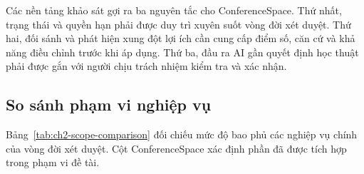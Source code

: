Các nền tảng khảo sát gợi ra ba nguyên tắc cho ConferenceSpace. Thứ nhất, trạng thái và quyền hạn phải được duy trì xuyên suốt vòng đời xét duyệt. Thứ hai, đối sánh và phát hiện xung đột lợi ích cần cung cấp điểm số, căn cứ và khả năng điều chỉnh trước khi áp dụng. Thứ ba, đầu ra AI gần quyết định học thuật phải được gắn với người chịu trách nhiệm kiểm tra và xác nhận.

\subsection{So sánh phạm vi nghiệp vụ}

Bảng~\ref{tab:ch2-scope-comparison} đối chiếu mức độ bao phủ các nghiệp vụ chính của vòng đời xét duyệt. Cột ConferenceSpace xác định phần đã được tích hợp trong phạm vi đề tài.

\begingroup
\setlength{\tabcolsep}{4pt}
\renewcommand{\arraystretch}{1.3}


